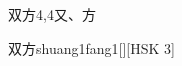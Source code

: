 \begin{entry}{双方}{4,4}{⼜、⽅}
  \begin{phonetics}{双方}{shuang1fang1}[][HSK 3]
  \end{phonetics}
\end{entry}
